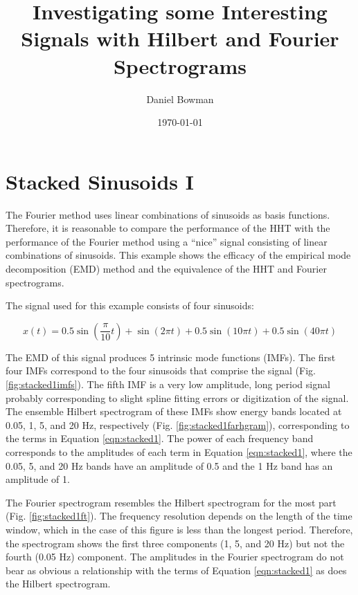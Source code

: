 \documentclass[12pt]{article}
\begin{document}
\title{Investigating some Interesting Signals with Hilbert and Fourier Spectrograms}
\author{Daniel Bowman}
\date{\today}
\maketitle
\tableofcontents


\section{Stacked Sinusoids I}

The Fourier method uses linear combinations of sinusoids as basis functions.
Therefore, it is reasonable to compare the performance of the HHT with the performance of the Fourier method
using a ``nice'' signal consisting of linear combinations of sinusoids.
This example shows the efficacy of the empirical mode decomposition (EMD) method and the equivalence of the HHT and Fourier spectrograms. 

The signal used for this example consists of four sinusoids: 

\begin{equation}
\label{eqn:stacked1}
x(t) =0.5\sin(\frac{\pi}{10} t) + \sin(2\pi t) + 0.5\sin(10\pi t) + 0.5\sin(40\pi t)
\end{equation}

The EMD of this signal produces 5 intrinsic mode functions (IMFs).
The first four IMFs correspond to the four sinusoids that comprise the signal (Fig. \ref{fig:stacked1imfs}).
The fifth IMF is a very low amplitude, long period signal probably corresponding to slight spline fitting errors or digitization of the signal.
The ensemble Hilbert spectrogram of these IMFs show energy bands located at 0.05, 1, 5, and 20 Hz, respectively (Fig. \ref{fig:stacked1farhgram}), 
corresponding to the terms in Equation \ref{eqn:stacked1}.
The power of each frequency band corresponds to the amplitudes of each term in Equation \ref{eqn:stacked1}, where the 0.05, 5, and 20 Hz bands have
an amplitude of 0.5 and the 1 Hz band has an amplitude of 1.

The Fourier spectrogram resembles the Hilbert spectrogram for the most part (Fig. \ref{fig:stacked1ft}).
The frequency resolution depends on the length of the time window, which in the case of this figure is less than the longest period.
Therefore, the spectrogram shows the first three components (1, 5, and 20 Hz) but not the fourth (0.05 Hz) component.
The amplitudes in the Fourier spectrogram do not bear as obvious a relationship with the terms of Equation \ref{eqn:stacked1} as does the Hilbert spectrogram.
\end{document}
